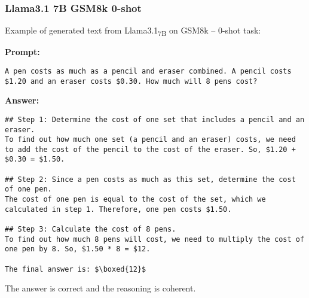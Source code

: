 \subsubsection*{Llama3.1 7B GSM8k 0-shot}
\noindent Example of generated text from Llama3.1\textsubscript{7B} on GSM8k -- 0-shot task:
\begin{displayquote}
	\textbf{Prompt:}
	\begin{Verbatim}[fontsize=\small,breaklines]
A pen costs as much as a pencil and eraser combined. A pencil costs $1.20 and an eraser costs $0.30. How much will 8 pens cost?
	\end{Verbatim}
	\textbf{Answer:}
	\begin{Verbatim}[fontsize=\small,breaklines]
## Step 1: Determine the cost of one set that includes a pencil and an eraser.
To find out how much one set (a pencil and an eraser) costs, we need to add the cost of the pencil to the cost of the eraser. So, $1.20 + $0.30 = $1.50.

## Step 2: Since a pen costs as much as this set, determine the cost of one pen.
The cost of one pen is equal to the cost of the set, which we calculated in step 1. Therefore, one pen costs $1.50.

## Step 3: Calculate the cost of 8 pens.
To find out how much 8 pens will cost, we need to multiply the cost of one pen by 8. So, $1.50 * 8 = $12.

The final answer is: $\boxed{12}$
	\end{Verbatim}
\end{displayquote}
The answer is correct and the reasoning is coherent.
